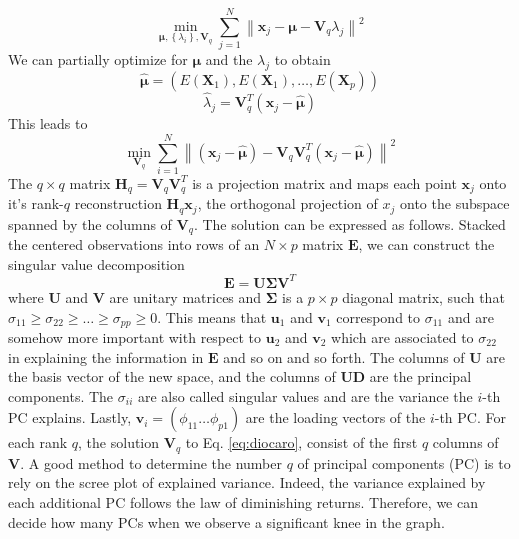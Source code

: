 \begin{equation}
    \label{eq:SSE}
    \min _{\bm{\mu},\left\{\lambda_i\right\}, \mathbf{V}_q} \sum_{j=1}^N\left\|\mathbf{x}_j-\bm{\mu}-\mathbf{V}_q \lambda_j\right\|^2
\end{equation}
We can partially optimize for $\bm{\mu}$ and the $\lambda_j$ to obtain
\begin{equation}
    \hat{\bm{\mu}} = \left(E\left(\mathbf{X}_1\right), E\left(\mathbf{X}_1\right), \dots, E\left(\mathbf{X}_p\right)\right)
\end{equation}
\begin{equation}
    \hat{\lambda}_j = \mathbf{V}_q^{T}(\mathbf{x}_j-\hat{\bm{\mu}})
\end{equation}
This leads to 
\begin{equation}
\label{eq:diocaro}
    \min _{\mathbf{V}_q} \sum_{i=1}^N\left\|\left(\mathbf{x}_j-\hat{\bm{\mu}}\right)-\mathbf{V}_q \mathbf{V}_q^T\left(\mathbf{x}_j-\hat{\bm{\mu}}\right)\right\|^2
\end{equation}
The $q \times q$ matrix $\mathbf{H}_q=\mathbf{V}_q\mathbf{V}_q^T$ is a projection matrix and maps each point $\mathbf{x}_j$ onto it's rank-$q$ reconstruction $\mathbf{H}_q\mathbf{x}_j$, the orthogonal projection of $x_j$ onto the subspace spanned by the columns of $\mathbf{V}_q$. The solution can be expressed as follows. Stacked the centered observations into rows of an $N\times p$ matrix $\mathbf{E}$, we can construct the singular value decomposition
\begin{equation}
    \label{eq:SVD}
    \mathbf{E}=\mathbf{U}\bm{\Sigma}\mathbf{V}^T
\end{equation}
where $\mathbf{U}$ and $\mathbf{V}$ are unitary matrices and $\bm{\Sigma}$ is a $p \times p$ diagonal matrix, such that $\sigma_{11}\ge \sigma_{22} \ge \dots \ge \sigma_{pp}\ge 0$. This means that $\mathbf{u}_1$ and $\mathbf{v}_1$ correspond to $\sigma_{11}$ and are somehow more important with respect to $\mathbf{u}_2$ and $\mathbf{v}_2$ which are associated to $\sigma_{22}$ in explaining the information in $\mathbf{E}$ and so on and so forth. The columns of $\mathbf{U}$ are the basis vector of the new space, and the columns of $\mathbf{U}\mathbf{D}$ are the principal components. The $\sigma_{ii}$ are also called singular values and are the variance the $i$-th PC explains. Lastly, $\mathbf{v}_i=(\phi_{11} \dots \phi_{p1})$ are the loading vectors of the $i$-th PC.  For each rank $q$, the solution $\mathbf{V}_q$ to Eq. \ref{eq:diocaro}, consist of the first $q$ columns of $\mathbf{V}$. A good method to determine the number $q$ of principal components (PC) is to rely on the scree plot of explained variance. Indeed, the variance explained by each additional PC follows the law of diminishing returns. Therefore, we can decide how many PCs when we observe a significant knee in the graph.

